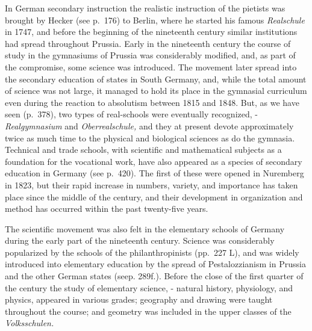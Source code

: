 \documentclass[
]{book}
\begin{document}
In German secondary instruction the realistic instruction of the pietists was brought by Hecker (see p.~176) to Berlin, where he started his famous \emph{Realschule} in 1747, and before the beginning of the nineteenth century similar institutions had spread throughout Prussia. Early in the nineteenth century the course of study in the gymnasiums of Prussia was considerably modified, and, as part of the compromise, some science was introduced. The movement later spread into the secondary education of states in South Germany, and, while the total amount of science was not large, it managed to hold its place in the gymnasial curriculum even during the reaction to absolutism between 1815 and 1848. But, as we have seen (p.~378), two types of real-schools were eventually recognized, - \emph{Realgymnasium} and \emph{Oberrealschule,} and they at present devote approximately twice as much time to the physical and biological sciences as do the gymnasia. Technical and trade schools, with scientific and mathematical subjects as a foundation for the vocational work, have also appeared as a species of secondary education in Germany (see p.~420). The first of these were opened in Nuremberg in 1823, but their rapid increase in numbers, variety, and importance has taken place since the middle of the century, and their development in organization and method has occurred within the past twenty-five years.

The scientific movement was also felt in the elementary schools of Germany during the early part of the nineteenth century. Science was considerably popularized by the schools of the philanthropinists (pp.~227 L), and was widely introduced into elementary education by the spread of Pestalozzianism in Prussia and the other German states (seep. 289f.). Before the close of the first quarter of the century the study of elementary science, - natural history, physiology, and physics, appeared in various grades; geography and drawing were taught throughout the course; and geometry was included in the upper classes of the \emph{Volksschulen.}
\end{document}
